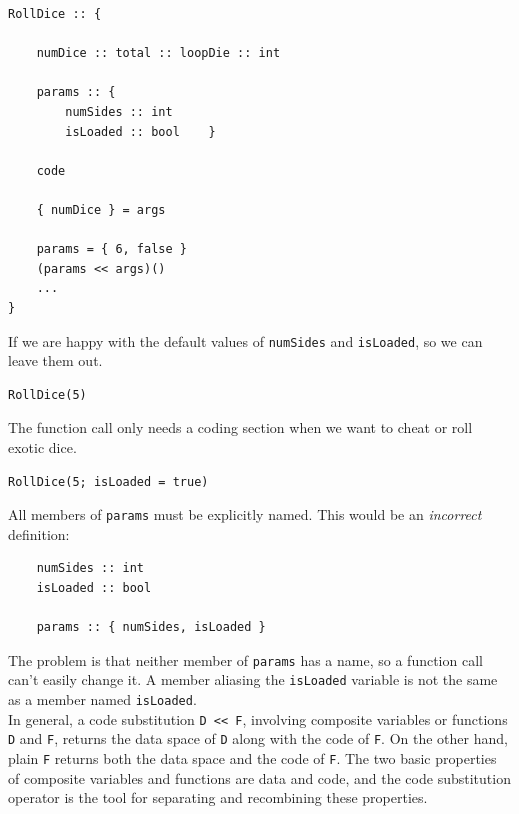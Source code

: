 \documentclass{article}
\newenvironment{code}{
       \begin{list}{}{
               \setlength{\leftmargin}{.4in}
               \setlength{\rightmargin}{0in}
               \setlength{\topsep}{.2in}
       }
       \small
       \item[] }
       { \end{list}   }
\begin{document}
\begin{code} \begin{verbatim}
RollDice :: {
    
    numDice :: total :: loopDie :: int
    
    params :: {
        numSides :: int
        isLoaded :: bool    }
    
    code
    
    { numDice } = args
    
    params = { 6, false }
    (params << args)()
    ...
}
\end{verbatim} \end{code}

\noindent If we are happy with the default values of \verb#numSides# and \verb#isLoaded#, so we can leave them out.

\begin{code} \begin{verbatim}
RollDice(5)
\end{verbatim} \end{code}

\noindent The function call only needs a coding section when we want to cheat or roll exotic dice.

\begin{code} \begin{verbatim}
RollDice(5; isLoaded = true)
\end{verbatim} \end{code}

All members of \verb#params# must be explicitly named.  This would be an \emph{incorrect} definition:

\begin{code} \begin{verbatim}
    numSides :: int
    isLoaded :: bool
    
    params :: { numSides, isLoaded }
\end{verbatim} \end{code}

\noindent The problem is that neither member of \verb#params# has a name, so a function call can't easily change it.  A member aliasing the \verb#isLoaded# variable is not the same as a member named \verb#isLoaded#.\\


In general, a code substitution \verb#D << F#, involving composite variables or functions \verb#D# and \verb#F#, returns the data space of \verb#D# along with the code of \verb#F#.  On the other hand, plain \verb#F# returns both the data space and the code of \verb#F#.  The two basic properties of composite variables and functions are data and code, and the code substitution operator is the tool for separating and recombining these properties.
\end{document}
